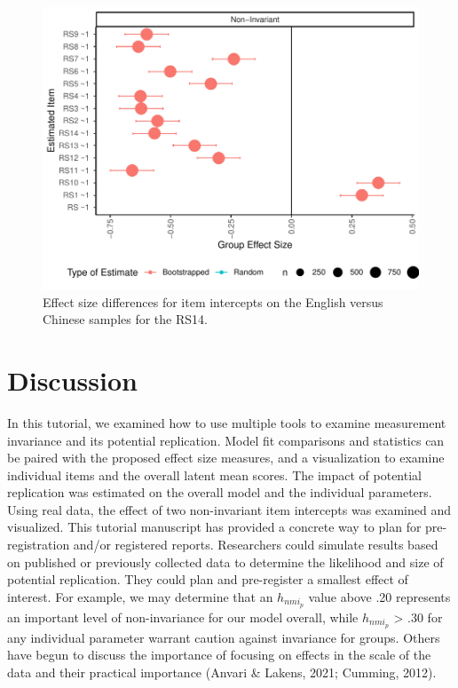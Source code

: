 \documentclass[
  man]{apa7}
\begin{document}
\begin{figure}
\centering
\includegraphics{manuscript_files/figure-latex/rs14-chinese-effect-pic-1.pdf}
\caption{\label{fig:rs14-chinese-effect-pic}Effect size differences for item intercepts on the English versus Chinese samples for the RS14.}
\end{figure}

\hypertarget{discussion}{%
\section{Discussion}\label{discussion}}

In this tutorial, we examined how to use multiple tools to examine measurement invariance and its potential replication. Model fit comparisons and statistics can be paired with the proposed effect size measures, and a visualization to examine individual items and the overall latent mean scores. The impact of potential replication was estimated on the overall model and the individual parameters. Using real data, the effect of two non-invariant item intercepts was examined and visualized. This tutorial manuscript has provided a concrete way to plan for pre-registration and/or registered reports. Researchers could simulate results based on published or previously collected data to determine the likelihood and size of potential replication. They could plan and pre-register a smallest effect of interest. For example, we may determine that an \(h_{nmi_p}\) value above .20 represents an important level of non-invariance for our model overall, while \(h_{nmi_p}\) \textgreater{} .30 for any individual parameter warrant caution against invariance for groups. Others have begun to discuss the importance of focusing on effects in the scale of the data and their practical importance (Anvari \& Lakens, 2021; Cumming, 2012).
\end{document}
